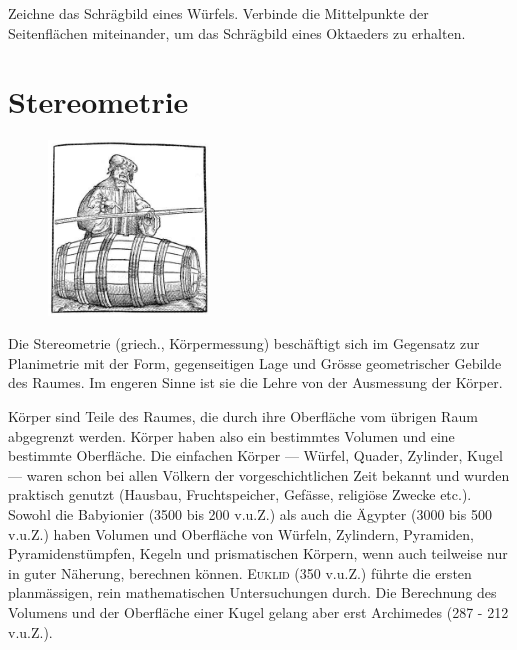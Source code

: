 \documentclass[%
11pt,%
twoside,%
titlepage,%
german,%
headsepline%
]{scrartcl}
\begin{document}
\begin{ueb}
Zeichne das Schr\"agbild eines W\"urfels. Verbinde die Mittelpunkte der Seitenfl\"achen miteinander, um das Schr\"agbild eines Oktaeders zu erhalten.
\end{ueb}

\clearpage

\section{Stereometrie}
\begin{figure}
  \begin{center}
    \includegraphics[width=0.382\textwidth]{pictures/fass}
  \end{center}
\end{figure}
Die Stereometrie (griech., K\"orpermessung) besch\"aftigt
sich im Gegensatz zur Planimetrie mit der Form, gegenseitigen Lage und Gr\"osse geometrischer Gebilde des Raumes. Im engeren Sinne ist sie die Lehre von der Ausmessung der K\"orper.

K\"orper sind Teile des Raumes, die durch ihre Oberfl\"ache vom \"ubrigen Raum abgegrenzt werden. K\"orper haben also ein bestimmtes Volumen und eine bestimmte Oberfl\"ache.
Die einfachen K\"orper --- W\"urfel, Quader, Zylinder, Kugel --- waren schon bei allen V\"olkern der vorgeschichtlichen Zeit bekannt und wurden praktisch genutzt (Hausbau, Fruchtspeicher, Gef\"asse, religi\"ose Zwecke etc.). Sowohl die Babyionier (3500 bis 200 v.u.Z.) als auch die \"Agypter (3000 bis 500 v.u.Z.) haben Volumen und Oberfl\"ache von W\"urfeln, Zylindern, Pyramiden, Pyramidenst\"umpfen, Kegeln und prismatischen K\"orpern, wenn auch teilweise nur in guter N\"aherung, berechnen k\"onnen. \textsc{Euklid} (350 v.u.Z.) f\"uhrte die ersten planm\"assigen, rein mathematischen Untersuchungen durch. Die Berechnung des Volumens und der Oberfl\"ache einer Kugel gelang aber erst Archimedes (287 - 212 v.u.Z.).
\end{document}
